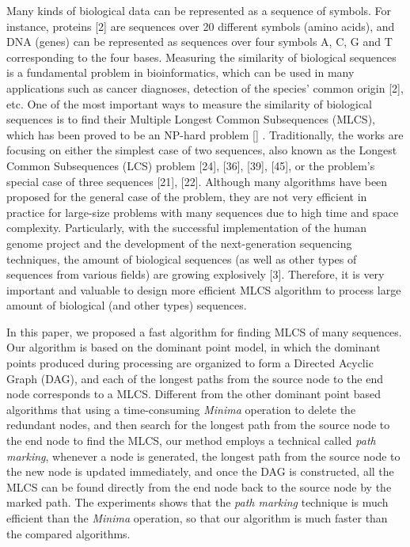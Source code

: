 Many kinds of biological data can be represented as a sequence of
symbols. For instance, proteins [2] are sequences over 20 different
symbols (amino acids), and DNA (genes) can be represented as sequences
over four symbols A, C, G and T corresponding to the four bases.
Measuring the similarity of biological sequences is a fundamental
problem in bioinformatics, which can be used in many applications such
as cancer diagnoses, detection of the species’ common origin [2],
etc. One of the most important ways to measure the similarity of
biological sequences is to find their Multiple Longest Common
Subsequences (MLCS), which has been proved to be an NP-hard problem []
. Traditionally, the works are focusing on either the simplest case of
two sequences, also known as the Longest Common Subsequences (LCS)
problem [24], [36], [39], [45], or the problem’s special case of
three sequences [21], [22]. Although many algorithms have been
proposed for the general case of the problem, they are not very
efficient in practice for large-size problems with many sequences due
to high time and space complexity. Particularly, with the successful
implementation of the human genome project and the development of the
next-generation sequencing techniques, the amount of biological
sequences (as well as other types of sequences from various fields)
are growing explosively [3]. Therefore, it is very important and
valuable to design more efficient MLCS algorithm to process large
amount of biological (and other types) sequences.

In this paper, we proposed a fast algorithm for finding MLCS of many
sequences. Our algorithm is based on the dominant point model, in
which the dominant points produced during processing are organized to
form a Directed Acyclic Graph (DAG), and each of the longest paths
from the source node to the end node corresponds to a MLCS. Different
from the other dominant point based algorithms that using a
time-consuming \emph{Minima} operation to delete the redundant nodes,
and then search for the longest path from the source node to the end
node to find the MLCS, our method employs a technical called
\emph{path marking}, whenever a node is generated, the longest path
from the source node to the new node is updated immediately, and once
the DAG is constructed, all the MLCS can be found directly from the
end node back to the source node by the marked path. The experiments
shows that the \emph{path marking} technique is much efficient than
the \emph{Minima} operation, so that our algorithm is much faster than
the compared algorithms.

